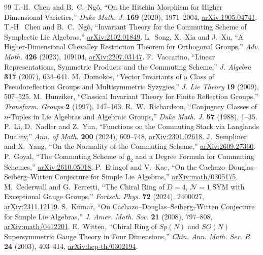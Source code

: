 \documentclass[11pt]{article}
\numberwithin{equation}{section}
\numberwithin{figure}{section}
\numberwithin{table}{section}
\begin{document}
\begin{thebibliography}{99}
T.-H.~Chen and B.~C.~Ng\^o, ``On the Hitchin Morphism for Higher Dimensional Varieties,'' \emph{Duke Math. J.} \textbf{169} (2020), 1971--2004, \href{https://arxiv.org/abs/1905.04741}{arXiv:1905.04741}.
T.-H.~Chen and B.~C.~Ng\^o, ``Invariant Theory for the Commuting Scheme of Symplectic Lie Algebras,'' \href{https://arxiv.org/abs/2102.01849}{arXiv:2102.01849}.
L.~Song, X.~Xia and J.~Xu, ``A Higher-Dimensional Chevalley Restriction Theorem for Orthogonal Groups,'' \emph{Adv. Math.} \textbf{426} (2023), 109104, \href{https://arxiv.org/abs/2207.03147}{arXiv:2207.03147}.
F.~Vaccarino, ``Linear Representations, Symmetric Products and the Commuting Scheme,'' \emph{J. Algebra} \textbf{317} (2007), 634--641.
M.~Domokos, ``Vector Invariants of a Class of Pseudoreflection Groups and Multisymmetric Syzygies,'' \emph{J. Lie Theory} \textbf{19} (2009), 507--525.
M.~Hunziker, ``Classical Invariant Theory for Finite Reflection Groups,'' \emph{Transform. Groups} \textbf{2} (1997), 147--163.
R.~W.~Richardson, ``Conjugacy Classes of $n$-Tuples in Lie Algebras and Algebraic Groups,'' \emph{Duke Math. J.} \textbf{57} (1988), 1--35.
P.~Li, D.~Nadler and Z.~Yun, ``Functions on the Commuting Stack via Langlands Duality,'' \emph{Ann. of Math.} \textbf{200} (2024), 609--748, \href{https://arxiv.org/abs/2301.02618}{arXiv:2301.02618}.
J.~Sempliner and X.~Yang, ``On the Normality of the Commuting Scheme,'' \href{https://arxiv.org/abs/2609.27360}{arXiv:2609.27360}.
P.~Goyal, ``The Commuting Scheme of $\mathfrak g_2$ and a Degree Formula for Commuting Schemes,'' \href{https://arxiv.org/abs/2610.05018}{arXiv:2610.05018}.
P.~Etingof and V.~Kac, ``On the Cachazo--Douglas--Seiberg--Witten Conjecture for Simple Lie Algebras,'' \href{https://arxiv.org/abs/math/0305175}{arXiv:math/0305175}.
M.~Cederwall and G.~Ferretti, ``The Chiral Ring of $D=4$, $\mathcal N=1$ SYM with Exceptional Gauge Groups,'' \emph{Fortsch. Phys.} \textbf{72} (2024), 2400027, \href{https://arxiv.org/abs/2311.12119}{arXiv:2311.12119}.
S.~Kumar, ``On Cachazo--Douglas--Seiberg--Witten Conjecture for Simple Lie Algebras,'' \emph{J. Amer. Math. Soc.} \textbf{21} (2008), 797--808, \href{https://arxiv.org/abs/math/0412201}{arXiv:math/0412201}.
E.~Witten, ``Chiral Ring of $Sp(N)$ and $SO(N)$ Supersymmetric Gauge Theory in Four Dimensions,'' \emph{Chin. Ann. Math. Ser. B} \textbf{24} (2003), 403--414, \href{https://arxiv.org/abs/hep-th/0302194}{arXiv:hep-th/0302194}.

\end{thebibliography}
\end{document}
